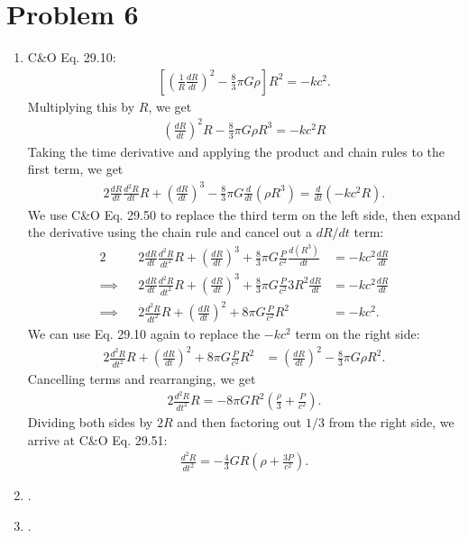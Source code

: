 \documentclass[11pt,letterpaper]{article}
\begin{document}
\newpage

\section*{Problem 6}
\begin{enumerate}[label=(\roman*)]
    \item C\&O Eq. 29.10:
        \begin{align*}
            \left[\left(\frac{1}{R}\frac{dR}{dt}\right)^2 - \frac{8}{3}\pi G\rho\right]R^2 = -kc^2.
        \end{align*}
        Multiplying this by $R$, we get 
        \begin{align*}
            \left(\frac{dR}{dt}\right)^2 R - \frac{8}{3}\pi G\rho R^3 = -kc^2R 
        \end{align*}
        Taking the time derivative and applying the product and chain rules to the first term, we get 
        \begin{align*}
            2\frac{dR}{dt}\frac{d^2R}{dt}R + \left(\frac{dR}{dt}\right)^3 - \frac{8}{3}\pi G \frac{d}{dt}(\rho R^3) = \frac{d}{dt}(-kc^2R).
        \end{align*}
        We use C\&O Eq. 29.50 to replace the third term on the left side, then expand the derivative using the chain rule and cancel out a $dR/dt$ term:
        \begin{alignat*}{2}
            &&2\frac{dR}{dt}\frac{d^2R}{dt^2}R + \left(\frac{dR}{dt}\right)^3 + \frac{8}{3}\pi G\frac{P}{c^2}\frac{d(R^3)}{dt} &= -kc^2\frac{dR}{dt} \\
            \implies&&2\frac{dR}{dt}\frac{d^2R}{dt^2}R + \left(\frac{dR}{dt}\right)^3 + \frac{8}{3}\pi G\frac{P}{c^2}3R^2\frac{dR}{dt} &= -kc^2\frac{dR}{dt} \\
            \implies&&2\frac{d^2R}{dt^2}R + \left(\frac{dR}{dt}\right)^2 + 8\pi G\frac{P}{c^2}R^2 &= -kc^2.
        \end{alignat*}
        We can use Eq. 29.10 again to replace the $-kc^2$ term on the right side: 
        \begin{align*}
            2\frac{d^2R}{dt^2}R + \left(\frac{dR}{dt}\right)^2 + 8\pi G\frac{P}{c^2}R^2 &= \left(\frac{dR}{dt}\right)^2 - \frac{8}{3}\pi G\rho R^2.
        \end{align*}
        Cancelling terms and rearranging, we get 
        \begin{align*}
            2\frac{d^2R}{dt^2}R = -8\pi GR^2(\frac{\rho}{3} + \frac{P}{c^2}).
        \end{align*}
        Dividing both sides by $2R$ and then factoring out $1/3$ from the right side, we arrive at C\&O Eq. 29.51:
        \begin{align*}
            \frac{d^2R}{dt^2} = -\frac{4}{3}GR(\rho + \frac{3P}{c^2}).
        \end{align*}
    \item .
    \item .
\end{enumerate}
\end{document}

